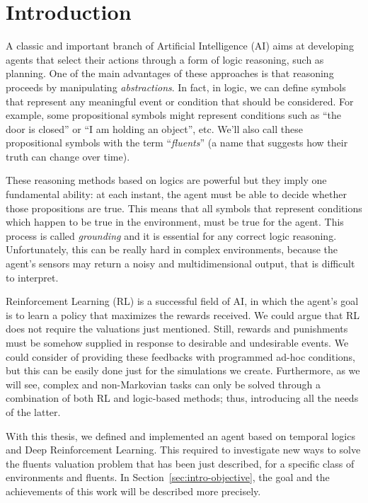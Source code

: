 \chapter{Introduction}


A classic and important branch of Artificial Intelligence (AI) aims at
developing agents that select their actions through a form of logic reasoning,
such as planning. One of the main advantages of these approaches is that
reasoning proceeds by manipulating \emph{abstractions}. In fact, in logic,
we can define symbols that represent any meaningful event or condition that
should be considered. For example, some propositional symbols might represent
conditions such as ``the door is closed'' or ``I am holding an object'', etc.
We'll also call these propositional symbols with the term ``\emph{fluents}''
(a name that suggests how their truth can change over time).

These reasoning methods based on logics are powerful but they imply one
fundamental ability: at each instant, the agent must be able to decide whether
those propositions are true. This means that all symbols that represent
conditions which happen to be true in the environment, must be true for the
agent. This process is called \emph{grounding} and it is essential for any
correct logic reasoning. Unfortunately, this can be really hard in complex
environments, because the agent's sensors may return a noisy and
multidimensional output, that is difficult to interpret.

Reinforcement Learning (RL) is a successful field of AI, in which the
agent's goal is to learn a policy that maximizes the rewards received.  We
could argue that RL does not require the valuations just mentioned. Still,
rewards and punishments must be somehow supplied in response to desirable and
undesirable events. We could consider of providing these feedbacks with
programmed ad-hoc conditions, but this can be easily done just for the
simulations we create. Furthermore, as we will see, complex and non-Markovian
tasks can only be solved through a combination of both RL and logic-based
methods; thus, introducing all the needs of the latter.

With this thesis, we defined and implemented an agent based on temporal logics
and Deep Reinforcement Learning. This required to investigate new ways to
solve the fluents valuation problem that has been just described, for a
specific class of environments and fluents. In
Section~\ref{sec:intro-objective}, the goal and the achievements of this work
will be described more precisely.


